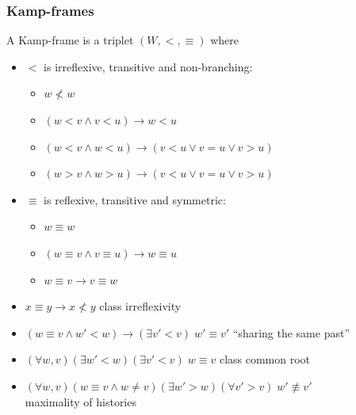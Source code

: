 \documentclass[xcolor=x11names]{beamer}
\newcommand{\lthen}{\rightarrow}
\newcommand{\forallp}[1]{(\forall #1)}
\newcommand{\existsp}[1]{(\exists #1)}
\begin{document}
\begin{frame}
	\frametitle{Kamp-frames}

A Kamp-frame is a triplet $(W, <, \equiv)$ where
\begin{itemize}
\item $<$ is irreflexive, transitive and non-branching:
\begin{itemize}
\item $w\not < w$
\item $(w<v \land v<u )\lthen w<u$
\item $(w<v \land w<u) \lthen (v<u\lor v=u\lor v>u)$
\item $(w>v \land w>u) \lthen (v<u\lor v=u\lor v>u)$
\end{itemize}
\item $\equiv$ is reflexive, transitive and symmetric:
\begin{itemize}
\item $w\equiv w$
\item $(w\equiv v \land v\equiv u )\lthen w\equiv u$
\item $w\equiv v \lthen v\equiv w$
\end{itemize}
\item $x \equiv y \lthen x\not <y$ \hfill class irreflexivity
\item $(w \equiv v \land w'<w ) \lthen \existsp {v'<v} \;w'\equiv v'$  \hfill  ``sharing the same past''
\item $\forallp{w,v}\existsp{w'<w}\existsp {v'<v} \;w\equiv v$ \hfill class common root
\item $\forallp{w,v} (w \equiv v \land w\neq v) \existsp{w'>w}\forallp {v'>v} \;w'\not\equiv v'$ \\ \hfill maximality of histories
\end{itemize}


\end{frame}
\end{document}
